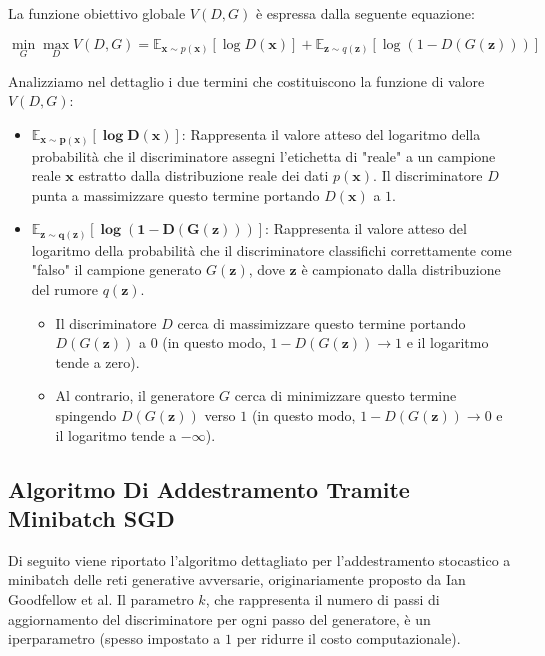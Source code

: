 ﻿\documentclass[11pt, a4paper]{article}
\begin{document}
La funzione obiettivo globale $V(D, G)$ è espressa dalla seguente equazione:

\[
\boxed{\min_{G} \max_{D} V(D, G) = \mathbb{E}_{\bm{x} \sim p(\bm{x})}[\log D(\bm{x})] + \mathbb{E}_{\bm{z} \sim q(\bm{z})}[\log(1 - D(G(\bm{z})))]}
\]

Analizziamo nel dettaglio i due termini che costituiscono la funzione di valore $V(D, G)$:
\begin{itemize}
    \item $\bm{\mathbb{E}_{\bm{x} \sim p(\bm{x})}[\log D(\bm{x})]}$: Rappresenta il valore atteso del logaritmo della probabilità che il discriminatore assegni l'etichetta di "reale" a un campione reale $\bm{x}$ estratto dalla distribuzione reale dei dati $p(\bm{x})$. Il discriminatore $D$ punta a massimizzare questo termine portando $D(\bm{x})$ a $1$.
    \item $\bm{\mathbb{E}_{\bm{z} \sim q(\bm{z})}[\log(1 - D(G(\bm{z})))]}$: Rappresenta il valore atteso del logaritmo della probabilità che il discriminatore classifichi correttamente come "falso" il campione generato $G(\bm{z})$, dove $\bm{z}$ è campionato dalla distribuzione del rumore $q(\bm{z})$.
    \begin{itemize}
        \item Il discriminatore $D$ cerca di massimizzare questo termine portando $D(G(\bm{z}))$ a $0$ (in questo modo, $1 - D(G(\bm{z})) \to 1$ e il logaritmo tende a zero).
        \item Al contrario, il generatore $G$ cerca di minimizzare questo termine spingendo $D(G(\bm{z}))$ verso $1$ (in questo modo, $1 - D(G(\bm{z})) \to 0$ e il logaritmo tende a $-\infty$).
    \end{itemize}
\end{itemize}

\newpage

\subsection{Algoritmo Di Addestramento Tramite Minibatch SGD}

Di seguito viene riportato l'algoritmo dettagliato per l'addestramento stocastico a minibatch delle reti generative avversarie, originariamente proposto da Ian Goodfellow et al. Il parametro $k$, che rappresenta il numero di passi di aggiornamento del discriminatore per ogni passo del generatore, è un iperparametro (spesso impostato a $1$ per ridurre il costo computazionale).
\end{document}
